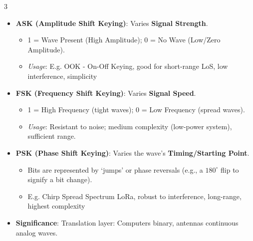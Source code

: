 \documentclass[a4paper, 9pt, landscape]{extarticle}
\makeatletter
\renewcommand{\subsubsection}{\@startsection{paragraph}{4}{0mm}%
                                {-1ex plus -.5ex minus -.2ex}%
                                {0.5ex plus .2ex}%
                                {\normalfont\footnotesize\bfseries}}
\makeatother
\begin{document}
\begin{multicols*}{3}
\begin{itemize}
  \item \textbf{ASK (Amplitude Shift Keying)}: Varies \textbf{Signal Strength}. 
    \begin{itemize}
      \item 1 = Wave Present (High Amplitude); 0 = No Wave (Low/Zero Amplitude).
      \item \textit{Usage}: E.g. OOK - On-Off Keying, good for short-range LoS, low interference, simplicity 
    \end{itemize}
  \item \textbf{FSK (Frequency Shift Keying)}: Varies \textbf{Signal Speed}.
    \begin{itemize}
      \item 1 = High Frequency (tight waves); 0 = Low Frequency (spread waves).
      \item \textit{Usage}: Resistant to noise; medium complexity (low-power system), sufficient range.
    \end{itemize}
  \item \textbf{PSK (Phase Shift Keying)}: Varies the wave's \textbf{Timing/Starting Point}.
    \begin{itemize}
      \item Bits are represented by `jumps' or phase reversals (e.g., a $180^\circ$ flip to signify a bit change).
      \item E.g. Chirp Spread Spectrum LoRa, robust to interference, long-range, highest complexity
    \end{itemize}
  \item \textbf{Significance}: Translation layer: Computers binary, antennas continuous analog waves.
\end{itemize}





\end{multicols*}
\end{document}
